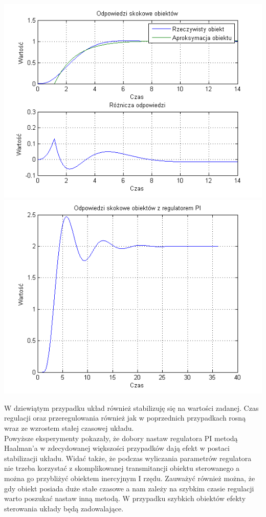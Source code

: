 \documentclass[10pt,a4paper]{article}
\begin{document}
\begin{center}
\includegraphics[scale=1]{images/jeden/skrypt_265.png}\\
\includegraphics[scale=1]{images/jeden/skrypt_266.png}\\
\end{center}
\newpage

W dziewiątym przypadku układ również stabilizuję się na wartości zadanej. Czas regulacji oraz przeregulowania również jak w poprzednich przypadkach rosną wraz ze wzrostem stałej czasowej układu.\\
Powyższe eksperymenty pokazały, że dobory nastaw regulatora PI metodą Haalman’a w zdecydowanej większości przypadków dają efekt w postaci stabilizacji układu. Widać także, że podczas wyliczania parametrów regulatora nie trzeba korzystać z skomplikowanej transmitancji obiektu sterowanego a można go przybliżyć obiektem inercyjnym I rzędu. Zauważyć również można, że gdy obiekt posiada duże stałe czasowe a nam zależy na szybkim czasie regulacji warto poszukać nastaw inną metodą. W przypadku szybkich obiektów efekty sterowania układy będą zadowalające.
\newpage
\end{document}
